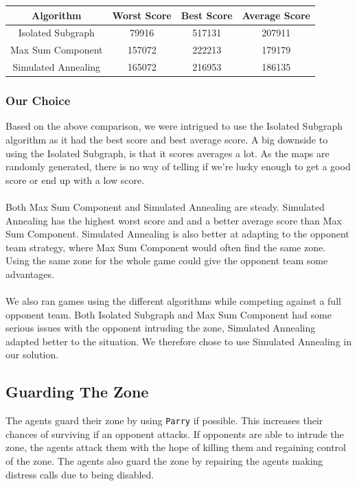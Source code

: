 \documentclass[11pt]{article}
\begin{document}
\begin{center}
\begin{tabular}{ | c | c | c | c | }
	\hline
	Algorithm & Worst Score & Best Score & Average Score\\ \hline
	Isolated Subgraph & 79916 & 517131 & 207911 \\
	Max Sum Component & 157072 & 222213 & 179179 \\
	Simulated Annealing & 165072 & 216953 & 186135 \\
\hline
\end{tabular}
\end{center}



\subsubsection{Our Choice}
Based on the above comparison, we were intrigued to use the Isolated Subgraph algorithm as it had the best score and best average score. A big downside to using the Isolated Subgraph, is that it scores averages a lot. As the maps are randomly generated, there is no way of telling if we're lucky enough to get a good score or end up with a low score.\\
\\
Both Max Sum Component and Simulated Annealing are steady. Simulated Annealing has the highest worst score and and a better average score than Max Sum Component. Simulated Annealing is also better at adapting to the opponent team strategy, where Max Sum Component would often find the same zone. Using the same zone for the whole game could give the opponent team some advantages.\\
\\
We also ran games using the different algorithms while competing against a full opponent team. Both Isolated Subgraph and Max Sum Component had some serious issues with the opponent intruding the zone, Simulated Annealing adapted better to the situation. We therefore chose to use Simulated Annealing in our solution.

\subsection{Guarding The Zone}
The agents guard their zone by using {\tt Parry} if possible. This increases their chances of surviving if an opponent attacks. If opponents are able to intrude the zone, the agents attack them with the hope of killing them and regaining control of the zone. The agents also guard the zone by repairing the agents making distress calls due to being disabled.
\end{document}
